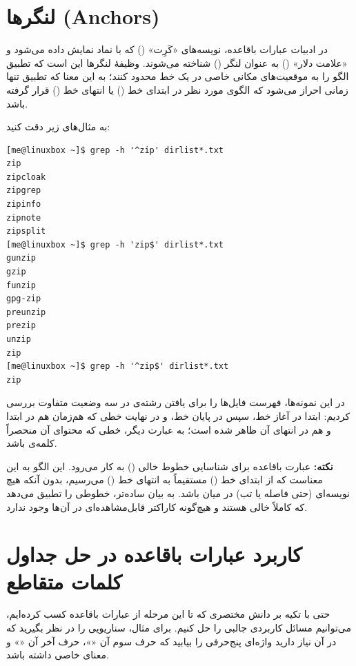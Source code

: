 \section{لنگرها (Anchors)}

در ادبیات عبارات باقاعده، نویسه‌های «کَرِت» () که با نماد \cmd{\^{}} نمایش داده می‌شود و «علامت دلار» (\cmd{\$}) به عنوان لنگر () شناخته می‌شوند. وظیفهٔ لنگرها این است که تطبیق الگو را به موقعیت‌های مکانی خاصی در یک خط محدود کنند؛ به این معنا که تطبیق تنها زمانی احراز می‌شود که الگوی مورد نظر در ابتدای خط (\cmd{\^{}}) یا انتهای خط (\cmd{\$}) قرار گرفته باشد.

به مثال‌های زیر دقت کنید:

\begin{latin}
\begin{lstlisting}
[me@linuxbox ~]$ grep -h '^zip' dirlist*.txt
zip
zipcloak
zipgrep
zipinfo
zipnote
zipsplit
[me@linuxbox ~]$ grep -h 'zip$' dirlist*.txt
gunzip
gzip
funzip
gpg-zip
preunzip
prezip
unzip
zip
[me@linuxbox ~]$ grep -h '^zip$' dirlist*.txt
zip
\end{lstlisting}
\end{latin}

در این نمونه‌ها، فهرست فایل‌ها را برای یافتن رشته‌ی  در سه وضعیت متفاوت بررسی کردیم: ابتدا در آغاز خط، سپس در پایان خط، و در نهایت خطی که  هم‌زمان هم در ابتدا و هم در انتهای آن ظاهر شده است؛ به عبارت دیگر، خطی که محتوای آن منحصراً کلمه‌ی  باشد.

\begin{note}
\textbf{نکته:} عبارت باقاعده \cmd{\^{}\$} برای شناسایی خطوط خالی () به کار می‌رود. این الگو به این معناست که از ابتدای خط (\cmd{\^{}}) مستقیماً به انتهای خط (\cmd{\$}) می‌رسیم، بدون آنکه هیچ نویسه‌ای (حتی فاصله یا تب) در میان باشد. به بیان ساده‌تر، \cmd{\^{}\$} خطوطی را تطبیق می‌دهد که کاملاً خالی هستند و هیچ‌گونه کاراکتر قابل‌مشاهده‌ای در آن‌ها وجود ندارد.
\end{note}

\section{کاربرد عبارات باقاعده در حل جداول کلمات متقاطع}

حتی با تکیه بر دانش مختصری که تا این مرحله از عبارات باقاعده کسب کرده‌ایم، می‌توانیم مسائل کاربردی جالبی را حل کنیم. برای مثال، سناریویی را در نظر بگیرید که در آن نیاز دارید واژه‌ای پنج‌حرفی را بیابید که حرف سوم آن «»، حرف آخر آن «» و معنای خاصی داشته باشد.

